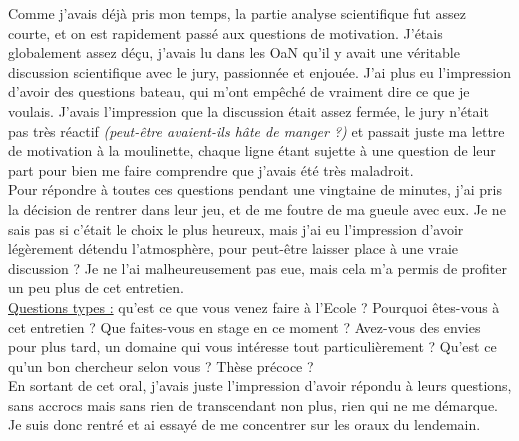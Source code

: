 Comme j'avais déjà pris mon temps, la partie analyse scientifique fut assez courte, et on est rapidement passé aux questions de motivation. J'étais globalement assez déçu, j'avais lu dans les OaN qu'il y avait une véritable discussion scientifique avec le jury, passionnée et enjouée. J'ai plus eu l'impression d'avoir des questions bateau, qui m'ont empêché de vraiment dire ce que je voulais. J'avais l'impression que la discussion était assez fermée, le jury n'était pas très réactif \textit{(peut-être avaient-ils hâte de manger ?)} et passait juste ma lettre de motivation à la moulinette, chaque ligne étant sujette à une question de leur part pour bien me faire comprendre que j'avais été très maladroit. \\

Pour répondre à toutes ces questions pendant une vingtaine de minutes, j'ai pris la décision de rentrer dans leur jeu, et de me foutre de ma gueule avec eux. Je ne sais pas si c'était le choix le plus heureux, mais j'ai eu l'impression d'avoir légèrement détendu l'atmosphère, pour peut-être laisser place à une vraie discussion ? Je ne l'ai malheureusement pas eue, mais cela m'a permis de profiter un peu plus de cet entretien.\\

\uline{Questions types :} qu'est ce que vous venez faire à l'Ecole ? Pourquoi êtes-vous à cet entretien ? Que faites-vous en stage en ce moment ? Avez-vous des envies pour plus tard, un domaine qui vous intéresse tout particulièrement ? Qu'est ce qu'un bon chercheur selon vous ? Thèse précoce ?\\

En sortant de cet oral, j'avais juste l'impression d'avoir répondu à leurs questions, sans accrocs mais sans rien de transcendant non plus, rien qui ne me démarque. Je suis donc rentré et ai essayé de me concentrer sur les oraux du lendemain. \\

